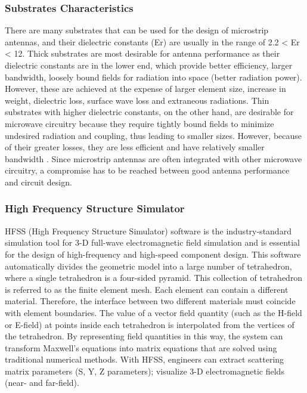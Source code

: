 \documentclass[12pt]{article}
\begin{document}
	          \subsubsection{ Substrates Characteristics}
	           \justify
	            There are many substrates that can be used for the design of microstrip antennas, and their dielectric constants (Er) are usually in the range of 2.2 < Er < 12. Thick substrates are most desirable for antenna performance as their dielectric constants are in the lower end, which provide better efficiency, larger bandwidth, loosely bound fields for radiation into space (better radiation power). However, these are achieved at the expense of larger element size, increase in weight, dielectric loss, surface wave loss and extraneous radiations. Thin substrates with higher dielectric constants, on the other hand, are desirable for microwave circuitry because they require tightly bound fields to minimize undesired radiation and coupling, thus leading to smaller sizes. However, because of their greater losses, they are less efficient and have relatively smaller bandwidth . Since microstrip antennas are often integrated with other microwave circuitry, a compromise has to be reached between good antenna performance and circuit design. 
	            
	           \subsubsection{High Frequency Structure Simulator }
	            \justify
	                HFSS (High Frequency Structure Simulator) software is the industry-standard simulation tool for 3-D full-wave electromagnetic field simulation and is essential for the design of high-frequency and high-speed component design. This software automatically divides the geometric model into a large number of tetrahedron, where a single tetrahedron is a four-sided pyramid. This collection of tetrahedron is referred to as the finite element mesh. Each element can contain a different material. Therefore, the interface between two different materials must coincide with element boundaries. The value of a vector field quantity (such as the H-field or E-field) at points inside each tetrahedron is interpolated from the vertices of the tetrahedron. By representing field quantities in this way, the system can transform Maxwell's equations into matrix equations that are solved using traditional numerical methods. With HFSS, engineers can extract scattering matrix parameters (S, Y, Z parameters); visualize 3-D electromagnetic fields (near- and far-field). 
	                
\end{document}
